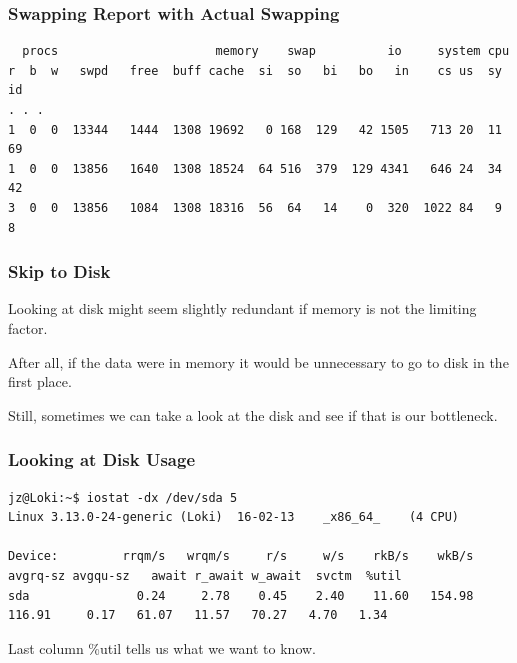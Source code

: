 \begin{frame}[fragile]
\frametitle{Swapping Report with Actual Swapping}

{\small
\begin{verbatim}
  procs                      memory    swap          io     system cpu
r  b  w   swpd   free  buff cache  si  so   bi   bo   in    cs us  sy  id
. . .
1  0  0  13344   1444  1308 19692   0 168  129   42 1505   713 20  11  69
1  0  0  13856   1640  1308 18524  64 516  379  129 4341   646 24  34  42
3  0  0  13856   1084  1308 18316  56  64   14    0  320  1022 84   9   8
\end{verbatim}
}

\end{frame}



\begin{frame}
\frametitle{Skip to Disk}


\begin{changemargin}{1cm}
Looking at disk might seem slightly redundant if memory is not the limiting factor. 

After all, if the data were in memory it would be unnecessary to go to disk in the first place. 

Still, sometimes we can take a look at the disk and see if that is our bottleneck.
\end{changemargin}

\end{frame}




\begin{frame}[fragile]
\frametitle{Looking at Disk Usage}

{\tiny
\begin{verbatim}
jz@Loki:~$ iostat -dx /dev/sda 5 
Linux 3.13.0-24-generic (Loki) 	16-02-13 	_x86_64_	(4 CPU)

Device:         rrqm/s   wrqm/s     r/s     w/s    rkB/s    wkB/s avgrq-sz avgqu-sz   await r_await w_await  svctm  %util
sda               0.24     2.78    0.45    2.40    11.60   154.98   116.91     0.17   61.07   11.57   70.27   4.70   1.34
\end{verbatim}
}


\begin{changemargin}{1cm}
Last column \%util tells us what we want to know.
\end{changemargin}

\end{frame}



